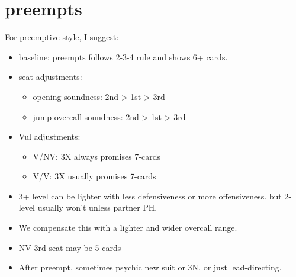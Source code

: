 \section{preempts}

For preemptive style, I suggest:

\begin{itemize}
    \setlength{\itemsep}{0pt}
    \item baseline: preempts follows 2-3-4 rule and shows 6+ cards. 
    \item seat adjustments: 
    \begin{itemize}
        \setlength{\itemsep}{0pt}
        \item opening soundness: 2nd > 1st > 3rd
        \item jump overcall soundness: 2nd > 1st > 3rd
    \end{itemize}
    \item Vul adjustments: 
    \begin{itemize}
        \setlength{\itemsep}{0pt}
        \item V/NV: 3X always promises 7-cards
        \item V/V: 3X usually promises 7-cards
    \end{itemize}
    \item 3+ level can be lighter with less defensiveness or more offensiveness. but 2-level usually won't unless partner PH.
    \item We compensate this with a lighter and wider overcall range.
    \item NV 3rd seat may be 5-cards
    \item After preempt, sometimes psychic new suit or 3N, or just lead-directing.
\end{itemize}




